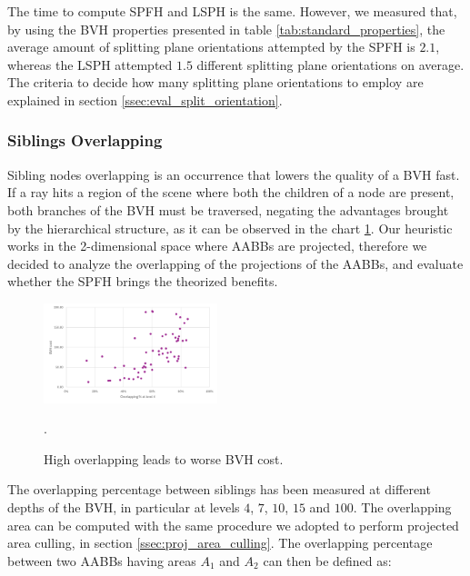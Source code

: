 \documentclass[acmtog, anonymous, review]{acmart}
\begin{document}
The time to compute SPFH and LSPH is the same. However, we measured that, by using the BVH properties presented in table \ref{tab:standard_properties}, the average amount of splitting plane orientations attempted by the SPFH is $2.1$, whereas the LSPH attempted $1.5$ different splitting plane orientations on average. The criteria to decide how many splitting plane orientations to employ are explained in section \ref{ssec:eval_split_orientation}.

\subsubsection{Siblings Overlapping}
Sibling nodes overlapping is an occurrence that lowers the quality of a BVH fast. If a ray hits a region of the scene where both the children of a node are present, both branches of the BVH must be traversed, negating the advantages brought by the hierarchical structure, as it can be observed in the chart \ref{fig:overlapping_scatter}. Our heuristic works in the 2-dimensional space where AABBs are projected, therefore we decided to analyze the overlapping of the projections of the AABBs, and evaluate whether the SPFH brings the theorized benefits.

\begin{figure}[H]
	\centering
	\includegraphics[width=0.45\textwidth]{Images/overlapping_quality_scatter.png}
	\caption{High overlapping leads to worse BVH cost.}
	\label{fig:overlapping_scatter}
  .
\end{figure}

The overlapping percentage between siblings has been measured at different depths of the BVH, in particular at levels $4$, $7$, $10$, $15$ and $100$. The overlapping area can be computed with the same procedure we adopted to perform projected area culling, in section \ref{ssec:proj_area_culling}. The overlapping percentage between two AABBs having areas $A_1$ and $A_2$ can then be defined as:
\end{document}
